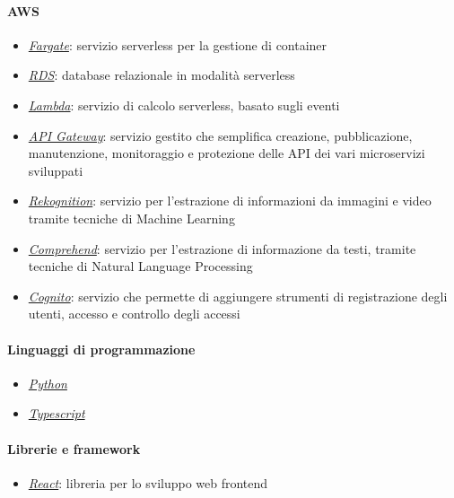 \paragraph*{AWS}
\begin{itemize}
	\item \href{https://aws.amazon.com/fargate/}{\emph{Fargate}}: servizio serverless per la gestione di container
	\item \href{https://aws.amazon.com/rds/}{\emph{RDS}}: database relazionale in modalità serverless
	\item \href{https://aws.amazon.com/lambda/}{\emph{Lambda}}: servizio di calcolo serverless, basato sugli eventi
	\item \href{https://aws.amazon.com/fargate/}{\emph{API Gateway}}: servizio gestito che semplifica creazione, pubblicazione, manutenzione, monitoraggio e protezione delle API dei vari microservizi sviluppati
	\item \href{https://aws.amazon.com/rekognition/}{\emph{Rekognition}}: servizio per l'estrazione di informazioni da immagini e video tramite tecniche di Machine Learning
	\item \href{https://aws.amazon.com/comprehend/}{\emph{Comprehend}}: servizio per l'estrazione di informazione da testi, tramite tecniche di Natural Language Processing
	\item \href{https://aws.amazon.com/cognito/}{\emph{Cognito}}: servizio che permette di aggiungere strumenti di registrazione degli utenti, accesso e controllo degli accessi 
\end{itemize}
\paragraph*{Linguaggi di programmazione}
\begin{itemize}
	\item \href{https://www.python.org/}{\emph{Python}}
	\item \href{https://www.typescriptlang.org/}{\emph{Typescript}}
\end{itemize}
\paragraph*{Librerie e framework}
\begin{itemize}
	\item \href{https://reactjs.org/}{\emph{React}}: libreria per lo sviluppo web frontend
\end{itemize}
